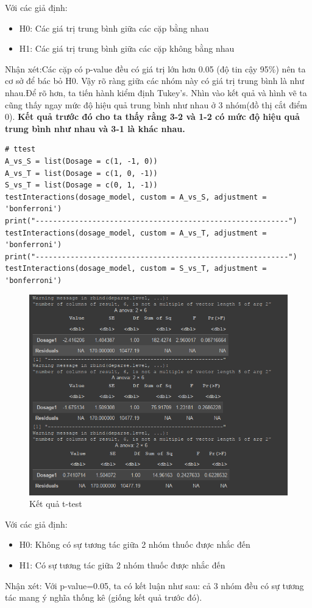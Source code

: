 \begin{itemize}
    Với các giả định:
        \begin{itemize}
            \item H0: Các giá trị trung bình giữa các cặp bằng nhau
            \item H1: Các giá trị trung bình giữa các cặp không bằng nhau
        \end{itemize}
    Nhận xét:Các cặp có p-value đều có giá trị lớn hơn 0.05 (độ tin cậy 95\%) nên ta cơ sở để bác bỏ H0. Vậy rõ ràng giữa các nhóm này có giá trị trung bình là như nhau.Để rõ hơn, ta tiến hành kiểm định Tukey's. Nhìn vào kết quả và hình vẽ ta cũng thấy ngay mức độ hiệu quả trung bình như nhau ở 3 nhóm(đồ thị cắt điểm 0). \textbf{Kết quả trước đó cho ta thấy rằng  3-2 và 1-2 có mức độ hiệu quả trung bình như nhau  và 3-1 là khác nhau.}

    \begin{lstlisting}
# ttest
A_vs_S = list(Dosage = c(1, -1, 0))
A_vs_T = list(Dosage = c(1, 0, -1))
S_vs_T = list(Dosage = c(0, 1, -1))
testInteractions(dosage_model, custom = A_vs_S, adjustment = 'bonferroni')
print("----------------------------------------------------------")
testInteractions(dosage_model, custom = A_vs_T, adjustment = 'bonferroni')
print("----------------------------------------------------------")
testInteractions(dosage_model, custom = S_vs_T, adjustment = 'bonferroni')
    \end{lstlisting}
\begin{figure}[H]
    \centering
    \includegraphics[width=0.8\linewidth]{part01_figures/36.png}
    \caption{Kết quả t-test}
    \label{fig:Kết quả t-test}
\end{figure}
    
    Với các giả định:
    \begin{itemize}
        \item H0: Không có sự tương tác giữa 2 nhóm thuốc được nhắc đến
        \item H1: Có sự tương tác giữa 2 nhóm thuốc được nhắc đến
    \end{itemize}
    Nhận xét: Với p-value=0.05, ta có kết luận như sau: cả 3 nhóm đều có sự tương tác mang ý nghĩa thống kê (giống kết quả trước đó).


\end{itemize}
